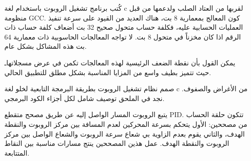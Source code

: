كُتب برنامج تشغيل الروبوت باستخدام لغة c لقربها من العتاد الصلب ولدعمها من قبل منظومة GCC. كون المعالج بمعمارية 8 بت، هناك العديد من القيود على سرعة تنفيذ العمليات الحسابية عليه، فكلفة حساب متحول صحيح 32 بت أضعاف كلفة حساب ذات الرقم اذا كان مخزناً في متحول 8 بت. لا تواجه المعالجات الحاسوبية ذات معمارية 64 بت هذه المشاكل بشكل عام.

يمكن القول بأن نقطة الضعف الرئيسية لهذه المعالجات تكمن في عرض مسجلاتهاـ حيث تتميز بطيف واسع من المزايا المناسبة بشكل مطلق للتطبيق الحالي. 


صمم نظام تشغيل الروبوت بطريقة البرمجة التابعية لخلو لغة c من الأغراض والصفوف. نجد في الملحق توصيف شامل لكل أجزاء الكود البرمجي.

يتبع الروبوت المسار الواصل إليه عن طريق مصحح متقطع PID. تتكون حلقة الحساب من مصححين: الأول يتحكم بسرعة المحركين لعدم المسافة بين مركز الروبوت والنقطة الهدف، والثاني يقوم بعدم الزاوية بي شعاع سرعة الروبوت والشعاع الواصل بين مركز الروبوت والنقطة الهدف. عمل هذين المصححين ينتج مسارات مناسبة بين النقاط المتتابعة.

